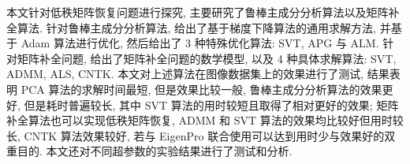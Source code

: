 \documentclass[12pt]{article}
\begin{document}
本文针对低秩矩阵恢复问题进行探究, 主要研究了鲁棒主成分分析算法以及矩阵补全算法. 针对鲁棒主成分分析算法, 给出了基于梯度下降算法的通用求解方法, 并基于 Adam 算法进行优化, 然后给出了 3 种特殊优化算法: SVT, APG 与 ALM. 针对矩阵补全问题, 给出了矩阵补全问题的数学模型, 以及 4 种具体求解算法: SVT, ADMM, ALS, CNTK. 本文对上述算法在图像数据集上的效果进行了测试, 结果表明 PCA 算法的求解时间最短, 但是效果比较一般, 鲁棒主成分分析算法的效果更好, 但是耗时普遍较长, 其中 SVT 算法的用时较短且取得了相对更好的效果; 矩阵补全算法也可以实现低秩矩阵恢复, ADMM 和 SVT 算法的效果均比较好但用时较长, CNTK 算法效果较好, 若与 EigenPro 联合使用可以达到用时少与效果好的双重目的. 本文还对不同超参数的实验结果进行了测试和分析.

\setlength{\bibsep}{1.5pt}


\end{document}
